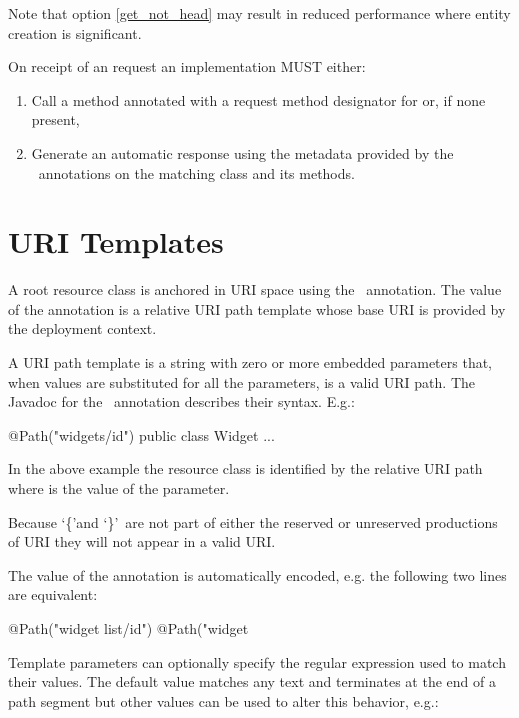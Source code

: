 Note that option \ref{get_not_head} may result in reduced performance where entity creation is significant.

On receipt of an  request an implementation MUST either:

\begin{enumerate}
\item Call a method annotated with a request method designator for  or, if none present,
\item Generate an automatic response using the metadata provided by the \jaxrs\ annotations on the matching class and its methods.
\end{enumerate}

\section{URI Templates}
\label{uritemplates}

A root resource class is anchored in URI space using the \Path\ annotation. The value of the annotation is a relative URI path template whose base URI is provided by the deployment context.

A URI path template is a string with zero or more embedded parameters that, when values are substituted for all the parameters, is a valid URI\cite{uri} path. The Javadoc for the \Path\ annotation describes their syntax. E.g.:

\begin{listing}{1}
@Path("widgets/{id}")
public class Widget {
  ...
}\end{listing}

In the above example the  resource class is identified by the relative URI path  where  is the value of the  parameter.

\begin{nnnote}Because \lq\{\rq and \lq\}\rq\ are not part of either the reserved or unreserved productions of URI\cite{uri} they will not appear in a valid URI.\end{nnnote}

The value of the annotation is automatically encoded, e.g. the following two lines are equivalent:

\begin{listing}{1}
@Path("widget list/{id}")
@Path("widget%
\end{listing}

Template parameters can optionally specify the regular expression used to match their values. The default value matches any text and terminates at the end of a path segment but other values can be used to alter this behavior, e.g.:

